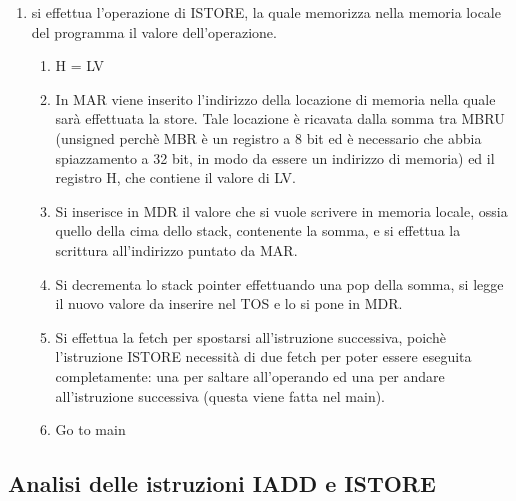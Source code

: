 \documentclass[12pt]{article}
\begin{document}
\begin{enumerate}[resume]
    \item si effettua l'operazione di ISTORE, la quale memorizza nella memoria locale del programma il valore dell'operazione.
          \begin{enumerate}
              \item H = LV
              \item In MAR viene inserito l’indirizzo della locazione di memoria nella quale sarà effettuata la store. Tale locazione è ricavata dalla somma tra MBRU (unsigned perchè MBR è un registro a 8 bit ed è necessario che abbia spiazzamento a 32 bit, in modo da essere un indirizzo di memoria) ed il registro H, che contiene il valore di LV.
              \item Si inserisce in MDR il valore che si vuole scrivere in memoria locale, ossia quello della cima dello stack, contenente la somma, e si effettua la scrittura all'indirizzo puntato da MAR.
              \item Si decrementa lo stack pointer effettuando una pop della somma, si legge il nuovo valore da inserire nel TOS e lo si pone in MDR.
              \item Si effettua la fetch per spostarsi all'istruzione successiva, poichè l'istruzione ISTORE necessità di due fetch per poter essere eseguita completamente: una per saltare all'operando ed una per andare all'istruzione successiva (questa viene fatta nel main).
              \item Go to main
          \end{enumerate}
\end{enumerate}
\clearpage
\subsection{Analisi delle istruzioni IADD e ISTORE}
\end{document}
